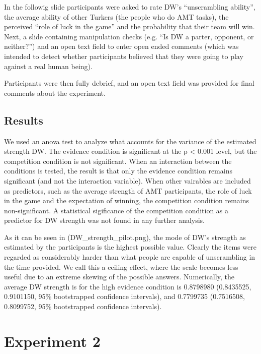 \documentclass{article}
\begin{document}
In the followig slide participants were asked to rate DW's ``unscrambling ability'', the average ability of other Turkers (the people who do AMT tasks), the perceived ``role of luck in the game'' and the probability that their team will win. Next, a slide containing manipulation checks (e.g. ``Is DW a parter, opponent, or neither?'') and an open text field to enter open ended comments (which was intended to detect whether participants believed that they were going to play against a real human being).


Participants were then fully debrief, and an open text field was provided for final comments about the experiment. 




\subsection{Results}


We used an anova test to analyze what accounts for the variance of the estimated strength DW. The evidence condition is significant at the p < 0.001 level, but the competition condition is not significant. When an interaction between the conditions is tested, the result is that only the evidence condition remains significant (and not the interaction variable). When other vairables are included as predictors, such as the average strength of AMT participants, the role of luck in the game and the expectation of winning, the competition condition remains non-significant. A statistical sigificance of the competition condition as a predictor for DW strength was not found in any further analysis.

As it can be seen in (DW\_strength\_pilot.png), the mode of DW's strength as estimated by the participants is the highest possible value. Clearly the items were regarded as considerably harder than what people are capable of unscrambling in the time provided. We call this a ceiling effect, where the scale becomes less useful due to an extreme skewing of the possible answers. Numerically, the average DW strength is for the high evidence condition is 0.8798980 (0.8435525, 0.9101150, 95\% bootstrapped confidence intervals), and 0.7799735 (0.7516508, 0.8099752, 95\% bootstrapped confidence intervals).

\section{Experiment 2}
\end{document}
